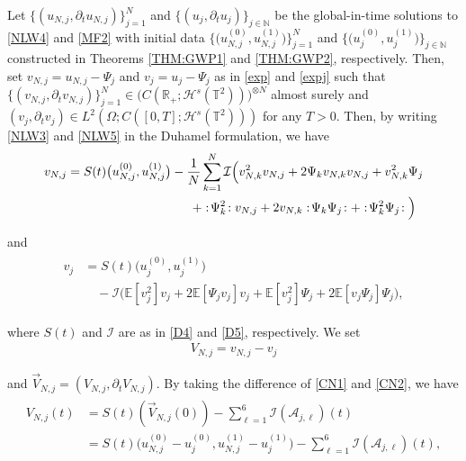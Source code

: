 \documentclass[letterpaper, 11pt,  reqno]{amsart}
\newcommand{\1}{\hspace{0.5mm}\text{I}\hspace{0.2mm}}
\newcommand{\noi}{\noindent}
\newcommand{\R}{\mathbb{R}}
\newcommand{\T}{\mathbb{T}}
\newcommand{\N}{\mathbb{N}}
\newcommand{\E}{\mathbb{E}}
\renewcommand{\H}{\mathcal{H}}
\newcommand{\dt}{\partial_t}
\newcommand{\A}{\mathcal{A}}
\newcommand{\wick}[1]{:\!{#1}\!:}
\newcommand{\I}{\mathcal{I}}
\renewcommand{\O}{\Omega}
\renewcommand{\l}{\ell}
\numberwithin{equation}{section}
\numberwithin{theorem}{section}
\begin{document}
Let 
$\{ (u_{N, j}, \dt  u_{N, j})\}_{j = 1}^N$
and $\{(u_j, \dt u_j)\}_{j \in \N}$
be the global-in-time solutions to \eqref{NLW4} 
and \eqref{MF2}
with initial data $\big\{ \big(u_{N, j}^{(0)}, u_{N, j}^{(1)}\big)\big\}_{j = 1}^N$
and $\big\{\big(u_{j}^{(0)}, u_{ j}^{(1)}\big)\big\}_{j \in \N}$
 constructed in Theorems \ref{THM:GWP1}
and \ref{THM:GWP2}, respectively.
Then, set 
$v_{N, j} = u_{N, j} - \Psi_{j}$
and 
$v_j = u_j - \Psi_j$
as in \eqref{exp}
and \eqref{expj}
such that 
$\{(v_{N, j}, \dt v_{N, j})\}_{j = 1}^N
\in \big(  C (\R_+; \H^s (\T^2) )\big)^{\otimes N}$
almost surely
and 
$(v_j, \dt v_j) \in 
L^2(\O;  C ([0, T]; \H^s (\T^2) ))$
for any $T > 0$.
Then, 
by writing \eqref{NLW3} and \eqref{NLW5} in the Duhamel formulation, we have 
\begin{align}
\begin{split}
v_{N, j} 
& = S(t) \big( u_{N, j}^{(0)}, u_{N, j}^{(1)} \big) 
- \frac{1}{N} \sum_{k = 1}^N  \I\Big( 
v_{N, k}^2 v_{N, j}
+ 2 \Psi_k v_{N, k} v_{N, j}
  + v_{N, k}^2 \Psi_j \\
& 
\hphantom{XXXXXXXXXXX}
 + \wick{\Psi_k^2} v_{N, j} + 2 v_{N, k} \wick{ \Psi_k \Psi_j } 
+ \wick{\Psi_k^2 \Psi_j} \Big)
\end{split}
\label{CN1}
\end{align}

\noi
and
\begin{align}
\begin{split}
v_j 
& = S (t) \big(u_{j}^{(0)}, u_{ j}^{(1)} \big)\\
& \quad - \I\Big(
 \E [ v_j^2 ] v_j
+ 2 \E [ \Psi_j v_j ] v_j 
+ \E [ v_j^2 ] \Psi_j 
+ 2 \E [v_j  \Psi_j  ] \Psi_j \Big), 
\end{split}
\label{CN2}
\end{align}

\noi
where $S (t)$ and $\I$ are as in  \eqref{D4} and  \eqref{D5}, 
respectively.
We set 
\begin{align}
V_{N, j} =  v_{N, j} - v_j 
\label{CN3}
\end{align}

\noi
and $\vec V_{N, j} = (V_{N, j}, \dt V_{N, j})$.
By taking the difference of \eqref{CN1} and \eqref{CN2}, we have
\begin{align}
\begin{split}
V_{N, j} (t)
& = S(t)
( \vec V_{N, j} (0)) 
 - \sum_{\l = 1}^6 \I(\A_{j, \l})(t)\\
& = S(t)
\big( u_{N, j}^{(0)} - u_{j}^{(0)}, u_{N, j}^{(1)} 
- u_{j}^{(1)}\big) 
 - \sum_{\l = 1}^6 \I(\A_{j, \l})(t), 
\end{split}
\label{CN4}
\end{align}
\end{document}
